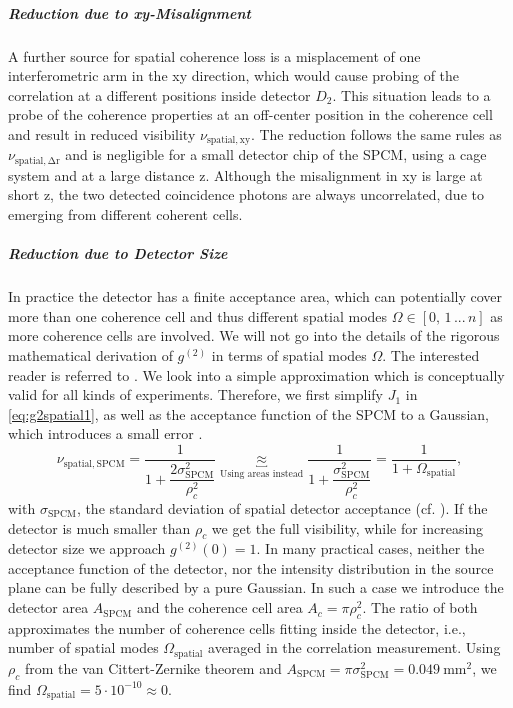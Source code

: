 \subparagraph{Reduction due to xy-Misalignment}
A further source for spatial coherence loss is a misplacement of one interferometric arm in the xy direction, which would cause probing of the correlation at a different positions inside detector $D_2$. This situation leads to a probe of the coherence properties at an off-center position in the coherence cell and result in reduced visibility $\nu_\mathrm{spatial,xy}$. The reduction follows the same rules as $\nu_\mathrm{spatial,\Delta r}$ and is negligible for a small detector chip of the \ac{SPCM}, using a cage system and at a large distance z. Although the misalignment in xy is large at short z, the two detected coincidence photons are always uncorrelated, due to emerging from different coherent cells.

\subparagraph{Reduction due to Detector Size}
In practice the detector has a finite acceptance area, which can potentially cover more than one coherence cell and thus different spatial modes $\Omega \in [0,\,1\,...\, n]$ as more coherence cells are involved.
We will not go into the details of the rigorous mathematical derivation of $g^{(2)}$ in terms of spatial modes $\Omega$. The interested reader is referred to \cite{pscherer_measurement_2016}.
We look into a simple approximation which is conceptually valid for all kinds of experiments. Therefore, we first simplify $J_1$ in \cref{eq:g2spatial1}, as well as the acceptance function of the SPCM \cite{perkin_data_2001} to a Gaussian, which introduces a small error \cite{pscherer_measurement_2016}.
\begin{equation}\label{eq:g2coherencelossxy}
	\nu_\mathrm{spatial,SPCM}=\dfrac{1}{1+\dfrac{2\sigma^2_\mathrm{SPCM}}{\rho_c^2}}\underbracket{\approx}_{\text{Using areas instead}}\dfrac{1}{1+\dfrac{\sigma_\mathrm{SPCM}^2}{\rho_c^2}}=\dfrac{1}{1+\Omega_\mathrm{spatial}},
\end{equation}
with $\sigma_\mathrm{SPCM}$, the standard deviation of spatial detector acceptance (cf. \cite{perkin_data_2001}). If the detector is much smaller than $\rho_c$ we get the full visibility, while for increasing detector size we approach $g^{(2)}(0)=1$. In many practical cases, neither the acceptance function of the detector, nor the intensity distribution in the source plane can be fully described by a pure Gaussian. In such a case we introduce the detector area $A_\mathrm{SPCM}$ and the coherence cell area $A_c=\pi\rho^2_c$. The ratio of both approximates the number of coherence cells fitting inside the detector, i.e., number of spatial modes $\Omega_\mathrm{spatial}$ averaged in the correlation measurement. Using $\rho_c$ from the van Cittert-Zernike theorem and $A_\mathrm{SPCM}=\pi\sigma_\mathrm{SPCM}^2=\SI{0.049}{\square \mm}$, we find $\Omega_\mathrm{spatial}=5\cdot10^{-10}\approx0$.\\

